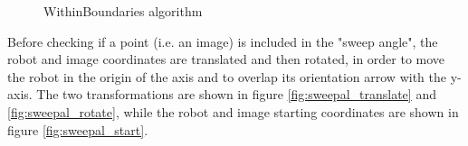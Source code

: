 \begin{figure}[htp]
\begin{center}
    \hspace*{15pt}

    \vspace*{20pt}

  \end{center}
  \caption{WithinBoundaries algorithm}
  \label{fig:withingboundaries}
\end{figure}

%
Before checking if a point (i.e. an image) is included in the "sweep angle", the robot and image coordinates
are translated and then rotated, in order to move the robot in the origin of the axis and to overlap its
orientation arrow with the y-axis. The two transformations are shown in figure \ref{fig:sweepal_translate} and
\ref{fig:sweepal_rotate}, while the robot and image starting coordinates are shown in figure \ref{fig:sweepal_start}.
%


